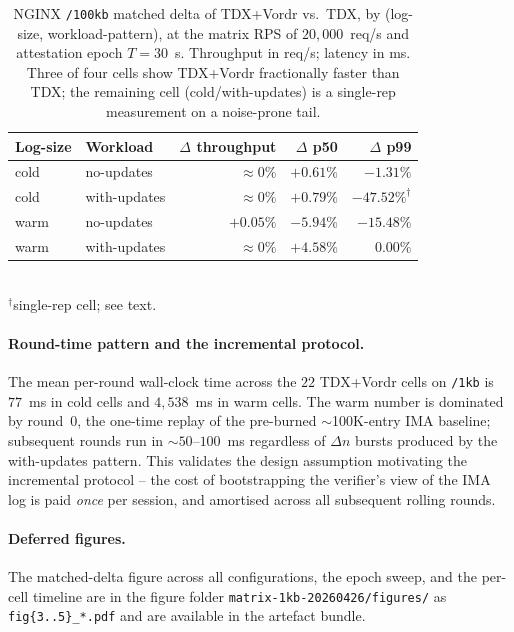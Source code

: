 \begin{table}[t]
\centering
\small
\caption{NGINX \texttt{/100kb} matched delta of TDX+Vordr vs.\ TDX, by
(log-size, workload-pattern), at the matrix RPS of $20{,}000$~req/s
and attestation epoch $T{=}30$~s. Throughput in req/s; latency in ms.
Three of four cells show TDX+Vordr fractionally faster than TDX; the
remaining cell (cold/with-updates) is a single-rep measurement on a
noise-prone tail.}
\label{tab:nginx-100kb-matched}
\begin{tabular}{@{}llrrr@{}}
\toprule
Log-size & Workload & $\Delta$ throughput & $\Delta$ p50 & $\Delta$ p99 \\
\midrule
cold & no-updates       & $\approx 0\%$  & $+0.61\%$ & $-1.31\%$  \\
cold & with-updates & $\approx 0\%$  & $+0.79\%$ & $-47.52\%^{\dagger}$ \\
warm & no-updates       & $+0.05\%$      & $-5.94\%$ & $-15.48\%$ \\
warm & with-updates & $\approx 0\%$  & $+4.58\%$ & $\phantom{+}0.00\%$ \\
\bottomrule
\end{tabular}\\[2pt]
{\footnotesize $^{\dagger}$single-rep cell; see text.}
\end{table}

\paragraph{Round-time pattern and the incremental protocol.}
The mean per-round wall-clock time across the $22$ TDX+Vordr cells
on \texttt{/1kb} is $77$~ms in cold cells and $4{,}538$~ms in warm
cells. The warm number is dominated by round~0, the one-time replay
of the pre-burned $\sim$100K-entry IMA baseline; subsequent rounds run
in $\sim$$50$--$100$~ms regardless of $\Delta n$ bursts produced by
the with-updates pattern. This validates the design assumption
motivating the incremental protocol -- the cost of bootstrapping the
verifier's view of the IMA log is paid \emph{once} per session, and
amortised across all subsequent rolling rounds.

\paragraph{Deferred figures.}
The matched-delta figure across all configurations, the epoch sweep,
and the per-cell timeline are in the figure folder
\texttt{matrix-1kb-20260426/figures/} as
\texttt{fig\{3..5\}\_*.pdf} and are available in the artefact bundle.
